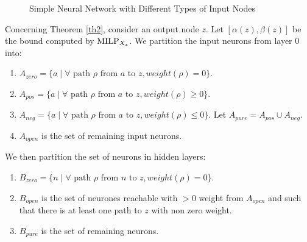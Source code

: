 \begin{figure}[h]
	\caption{Simple Neural Network with Different Types of Input Nodes}
	\label{fig:neural_network_types_simplified}
\end{figure}

Concerning Theorem \ref{th2}, consider an output node $z$.
Let $[\alpha(z),\beta(z)]$ be the bound computed by ${\textrm{MILP}}_{X_z}$.
We partition the input neurons from layer $0$ into:
\begin{enumerate}
	\item $A_{zero}= \{a \mid \forall \text{ path $\rho$ from $a$ to } z, weight(\rho)=0\}$.
	\item $A_{pos}= \{a \mid \forall \text{ path $\rho$ from $a$ to } z, weight(\rho)\geq0\}$.
	\item  $A_{neg}= \{a \mid \forall \text{ path $\rho$ from $a$ to } z, weight(\rho)\leq0\}$.
	Let $A_{pure}=A_{pos} \cup A_{neg}$.
	\item $A_{open}$ is the set of remaining input neurons.
\end{enumerate}

We then partition the set of neurons in hidden layers: 
\begin{enumerate}
	\item $B_{zero}= \{n \mid \forall \text{ path $\rho$ from $n$ to } z, weight(\rho)=0\}$.
	\item $B_{open}$ is the set of neurones reachable with $>0$ weight from $A_{open}$ and such that there is at least one path to $z$ with non zero weight.
	\item $B_{pure}$ is the set of remaining neurons.
\end{enumerate}

